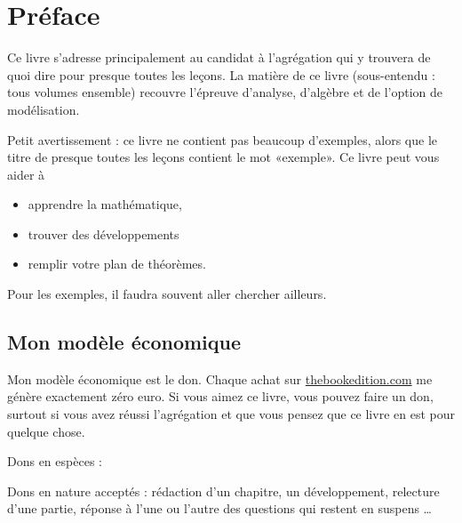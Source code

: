 
\section{Préface}

Ce livre s'adresse principalement au candidat à l'agrégation qui y trouvera de quoi dire pour presque toutes les leçons. La matière de ce livre (sous-entendu : tous volumes ensemble) recouvre l'épreuve d'analyse, d'algèbre et de l'option de modélisation.

Petit avertissement : ce livre ne contient pas beaucoup d'exemples, alors que le titre de presque toutes les leçons contient le mot «exemple». Ce livre peut vous aider à
\begin{itemize}
    \item apprendre la mathématique,
    \item trouver des développements
    \item remplir votre plan de théorèmes.
\end{itemize}
Pour les exemples, il faudra souvent aller chercher ailleurs.

\subsection*{Mon modèle économique}

Mon modèle économique est le don. Chaque achat sur \href{http://www.thebookedition.com/fr/}{thebookedition.com} me génère exactement zéro euro. Si vous aimez ce livre, vous pouvez faire un don, surtout si vous avez réussi l'agrégation et que vous pensez que ce livre en est pour quelque chose.

Dons en espèces :


Dons en nature acceptés : rédaction d'un chapitre, un développement, relecture d'une partie, réponse à l'une ou l'autre des questions qui restent en suspens \ldots
